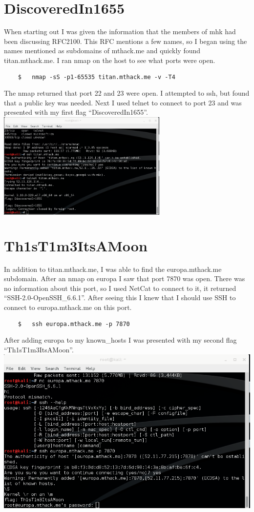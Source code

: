 \documentclass[12pt]{report}
\begin{document}
\section{DiscoveredIn1655}
When starting out I was given the information that the members of mhk had been discussing RFC2100. This RFC mentions a few names, so I began using the names mentioned as subdomains of mthack.me and quickly found titan.mthack.me. I ran nmap on the host to see what ports were open.\\
	\begin{verbatim}
	$	nmap -sS -p1-65535 titan.mthack.me -v -T4
	\end{verbatim}
The nmap returned that port 22 and 23 were open. I attempted to ssh, but found that a public key was needed. Next I used telnet to connect to port 23 and was presented with my first flag ``DiscoveredIn1655''.\\
\includegraphics[height=200px, width=\linewidth]{DiscoveredIn1655.png}
\newline
\section{Th1sT1m3ItsAMoon}
In addition to titan.mthack.me, I was able to find the europa.mthack.me subdomain. After an nmap on europa I saw that port 7870 was open. There was no information about this port, so I used NetCat to connect to it, it returned ``SSH-2.0-OpenSSH\_6.6.1''. After seeing this I knew that I should use SSH to connect to europa.mthack.me on this port.
	\begin{verbatim}
	$	ssh europa.mthack.me -p 7870
	\end{verbatim}
After adding europa to my known\_hosts I was presented with my second flag ``Th1sT1m3ItsAMoon''.\\
\includegraphics[scale=0.33, width=\linewidth]{Th1sT1m3ItsAMoon.png}
\newline
\end{document}
